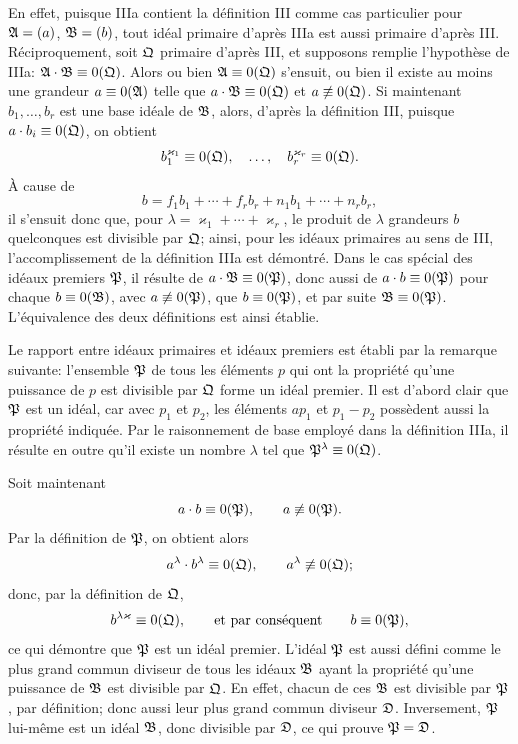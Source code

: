 En effet, puisque IIIa contient la définition III comme cas particulier pour $\mathfrak{A}=(a)$, $\mathfrak{B}=(b)$, tout idéal primaire d'après IIIa est aussi primaire d'après III. Réciproquement, soit $\mathfrak{Q}$ primaire d'après III, et supposons remplie l'hypothèse de IIIa: $\mathfrak{A}\cdot\mathfrak{B}\equiv0(\mathfrak{Q})$. Alors ou bien $\mathfrak{A}\equiv0(\mathfrak{Q})$ s'ensuit, ou bien il existe au moins une grandeur $a\equiv0(\mathfrak{A})$ telle que $a\cdot\mathfrak{B}\equiv0(\mathfrak{Q})$ et $a\not\equiv0(\mathfrak{Q})$. Si maintenant $b_1,\ldots,b_r$ est une base idéale de $\mathfrak{B}$, alors, d'après la définition III, puisque $a\cdot b_i\equiv0(\mathfrak{Q})$, on obtient
\[
 b_1^{\varkappa_1}\equiv0(\mathfrak{Q}),\quad \ldots,\quad b_r^{\varkappa_r}\equiv0(\mathfrak{Q}).
\]
À cause de
\[
 b=f_1b_1+\cdots+f_rb_r+n_1b_1+\cdots+n_rb_r,
\]
il s'ensuit donc que, pour $\lambda=\varkappa_1+\cdots+\varkappa_r$, le produit de $\lambda$ grandeurs $b$ quelconques est divisible par $\mathfrak{Q}$; ainsi, pour les idéaux primaires au sens de III, l'accomplissement de la définition IIIa est démontré. Dans le cas spécial des idéaux premiers $\mathfrak{P}$, il résulte de $a\cdot\mathfrak{B}\equiv0(\mathfrak{P})$, donc aussi de $a\cdot b\equiv0(\mathfrak{P})$ pour chaque $b\equiv0(\mathfrak{B})$, avec $a\not\equiv0(\mathfrak{P})$, que $b\equiv0(\mathfrak{P})$, et par suite $\mathfrak{B}\equiv0(\mathfrak{P})$. L'équivalence des deux définitions est ainsi établie.

Le rapport entre idéaux primaires et idéaux premiers est établi par la remarque suivante: l'ensemble $\mathfrak{P}$ de tous les éléments $p$ qui ont la propriété qu'une puissance de $p$ est divisible par $\mathfrak{Q}$ forme un idéal premier. Il est d'abord clair que $\mathfrak{P}$ est un idéal, car avec $p_1$ et $p_2$, les éléments $ap_1$ et $p_1-p_2$ possèdent aussi la propriété indiquée. Par le raisonnement de base employé dans la définition IIIa, il résulte en outre qu'il existe un nombre $\lambda$ tel que $\mathfrak{P}^\lambda\equiv0(\mathfrak{Q})$.

Soit maintenant
\[
 a\cdot b\equiv0(\mathfrak{P}),\qquad a\not\equiv0(\mathfrak{P}).
\]
Par la définition de $\mathfrak{P}$, on obtient alors
\[
 a^\lambda\cdot b^\lambda\equiv0(\mathfrak{Q}),\qquad a^\lambda\not\equiv0(\mathfrak{Q});
\]
donc, par la définition de $\mathfrak{Q}$,
\[
 b^{\lambda\varkappa}\equiv0(\mathfrak{Q}),\qquad \text{et par conséquent}\qquad b\equiv0(\mathfrak{P}),
\]
ce qui démontre que $\mathfrak{P}$ est un idéal premier. L'idéal $\mathfrak{P}$ est aussi défini comme le plus grand commun diviseur de tous les idéaux $\mathfrak{B}$ ayant la propriété qu'une puissance de $\mathfrak{B}$ est divisible par $\mathfrak{Q}$. En effet, chacun de ces $\mathfrak{B}$ est divisible par $\mathfrak{P}$, par définition; donc aussi leur plus grand commun diviseur $\mathfrak{D}$. Inversement, $\mathfrak{P}$ lui-même est un idéal $\mathfrak{B}$, donc divisible par $\mathfrak{D}$, ce qui prouve $\mathfrak{P}=\mathfrak{D}$.

